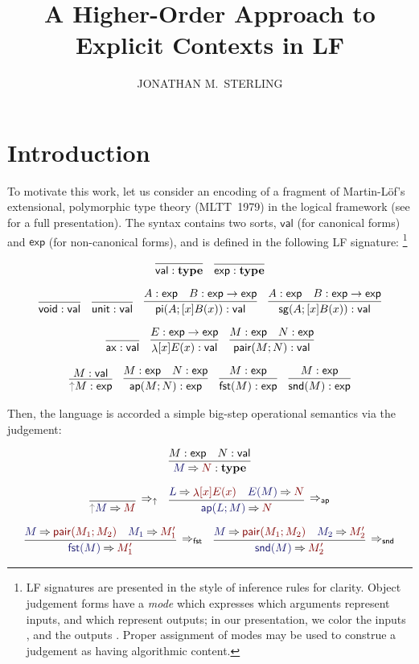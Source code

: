 \documentclass[acmtoplas]{acmtrans2m}
\title{A Higher-Order Approach to Explicit Contexts in LF}
\author{JONATHAN M.\ STERLING}
\def\InputModeColorName{MidnightBlue}
\def\OutputModeColorName{Maroon}
\newcommand\InputMode[1]{{\color{\InputModeColorName}{#1}}}
\newcommand\OutputMode[1]{{\color{\OutputModeColorName}{#1}}}
\newcommand\type{\mathbf{type}}
\newcommand\tyvoid{\mathsf{void}}
\newcommand\tyunit{\mathsf{unit}}
\newcommand\ax{\mathsf{ax}}
\newcommand\ap{\mathsf{ap}}
\newcommand\sortval{\mathsf{val}}
\newcommand\sortexp{\mathsf{exp}}
\newcommand\eval[2]{\InputMode{#1}\mathbin{\Rightarrow}\OutputMode{#2}}
\newcommand\thunk[1]{{\color{Gray}\uparrow}#1}
\newcommand\evalrule[1]{\Rightarrow_{#1}}
\DeclareMathOperator{\typi}{\mathsf{pi}}
\DeclareMathOperator{\tysg}{\mathsf{sg}}
\DeclareMathOperator{\lam}{\mathsf{\lambda}}
\DeclareMathOperator{\pair}{\mathsf{pair}}
\DeclareMathOperator{\fst}{\mathsf{fst}}
\DeclareMathOperator{\snd}{\mathsf{snd}}
\begin{document}
\maketitle

\section{Introduction}

To motivate this work, let us consider an encoding of a fragment of
Martin-L\"of's extensional, polymorphic type theory (MLTT~1979) in the logical
framework (see \cite{Martin-Lof-1979} for a full presentation). The syntax
contains two sorts, $\sortval$ (for canonical forms) and $\sortexp$ (for
non-canonical forms), and is defined in the following LF signature:
\footnote{LF signatures are presented in the style of inference rules for
  clarity. Object judgement forms have a \emph{mode} which expresses which
  arguments represent inputs, and which represent outputs; in our presentation,
  we color the inputs \emph{\InputMode\InputModeColorName}, and the outputs
  \emph{\OutputMode\OutputModeColorName}. Proper assignment of modes may be
used to construe a judgement as having algorithmic content.}

\begin{gather*}
  \infer{\sortval:\type}{}
  \quad
  \infer{\sortexp:\type}{}\\[6pt]
  \infer{\tyvoid:\sortval}{}
  \quad
  \infer{\tyunit:\sortval}{}
  \quad
  \infer{
    \typi(A;[x]B(x)):\sortval
  }{
    A:\sortexp &
    B:\sortexp\to\sortexp
  }
  \quad
  \infer{
    \tysg(A;[x]B(x)):\sortval
  }{
    A:\sortexp &
    B:\sortexp\to\sortexp
  }\\[6pt]
  \infer{\ax:\sortval}{}
  \quad
  \infer{
    \lam[x]E(x):\sortval
  }{
    E:\sortexp\to\sortexp
  }
  \quad
  \infer{
    \pair(M;N):\sortval
  }{
    M:\sortexp &
    N:\sortexp
  } \\[6pt]
  \infer{
    \thunk{M}:\sortexp
  }{
    M:\sortval
  }
  \quad
  \infer{
    \ap(M;N):\sortexp
  }{
    M:\sortexp &
    N:\sortexp
  }
  \quad
  \infer{
    \fst(M):\sortexp
  }{
    M:\sortexp
  }
  \quad
  \infer{
    \snd(M):\sortexp
  }{
    M:\sortexp
  }
\end{gather*}


Then, the language is accorded a simple big-step operational semantics via the
\framebox{$\eval{M}{N}$} judgement:

\begin{gather*}
  \infer{
    \eval{M}{N}:\type
  }{
    M:\sortexp &
    N:\sortval
  }\\[6pt]
  \infer[\evalrule\uparrow]{
    \eval{\thunk{M}}{M}
  }{
  }
  \quad
  \infer[\evalrule\ap]{
    \eval{\ap(L;M)}{N}
  }{
    \eval{L}{\lam[x]E(x)} &
    \eval{E(M)}{N}
  }\\[6pt]
  \infer[\evalrule\fst]{
    \eval{\fst(M)}{M_1'}
  }{
    \eval{M}{\pair(M_1;M_2)} &
    \eval{M_1}{M_1'}
  }
  \quad
  \infer[\evalrule\snd]{
    \eval{\snd(M)}{M_2'}
  }{
    \eval{M}{\pair(M_1;M_2)} &
    \eval{M_2}{M_2'}
  }
\end{gather*}
\end{document}
